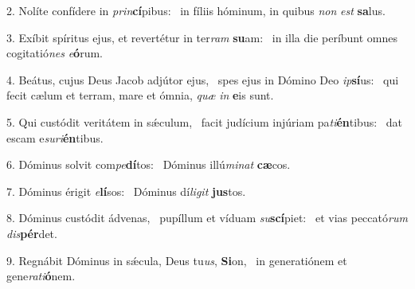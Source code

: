 2. Nolíte confídere in \textit{prin}\textbf{cí}pibus: \ast\  in fíliis hóminum, in quibus \textit{non} \textit{est} \textbf{sa}lus.\

3. Exíbit spíritus ejus, et revertétur in ter\textit{ram} \textbf{su}am: \ast\  in illa die períbunt omnes cogitatió\textit{nes} \textit{e}\textbf{ó}rum.\

4. Beátus, cujus Deus Jacob adjútor ejus, \dag\  spes ejus in Dómino Deo \textit{ip}\textbf{sí}us: \ast\  qui fecit cælum et terram, mare et ómnia, \textit{quæ} \textit{in} \textbf{e}is sunt.\

5. Qui custódit veritátem in sǽculum, \dag\  facit judícium injúriam pa\textit{ti}\textbf{én}tibus: \ast\  dat escam e\textit{su}\textit{ri}\textbf{én}tibus.\

6. Dóminus solvit com\textit{pe}\textbf{dí}tos: \ast\  Dóminus illú\textit{mi}\textit{nat} \textbf{cæ}cos.\

7. Dóminus érigit \textit{e}\textbf{lí}sos: \ast\  Dóminus dí\textit{li}\textit{git} \textbf{jus}tos.\

8. Dóminus custódit ádvenas, \dag\  pupíllum et víduam \textit{su}\textbf{scí}piet: \ast\  et vias peccató\textit{rum} \textit{dis}\textbf{pér}det.\

9. Regnábit Dóminus in sǽcula, Deus tu\textit{us}, \textbf{Si}on, \ast\  in generatiónem et gene\textit{ra}\textit{ti}\textbf{ó}nem.\

